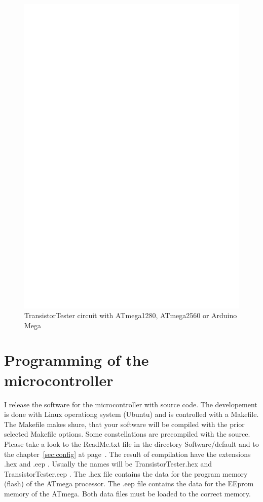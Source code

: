 \begin{figure}[H]
\centering
\includegraphics[width=18cm]{../FIG/t1280tester.eps}
\caption{TransistorTester circuit with ATmega1280, ATmega2560 or Arduino Mega}
\label{fig:t1280tester}
\end{figure}



\section{Programming of the microcontroller}
I release the software for the microcontroller with source code.
The developement is done with Linux operationg system (Ubuntu) and
is controlled with a Makefile. The Makefile makes shure, that your
software will be compiled with the prior selected Makefile options. Some constellations
are precompiled with the source. Please take a look to the ReadMe.txt file
in the directory Software/default and to the chapter~\ref{sec:config} at page~\pageref{sec:config}.
The result of compilation have the extensions .hex and .eep .
Usually the names will be TransistorTester.hex and TransistorTester.eep .
The .hex file contains the data for the program memory (flash) of the ATmega processor.
The .eep file contains the data for the EEprom memory of the ATmega. Both data files
must be loaded to the correct memory.

